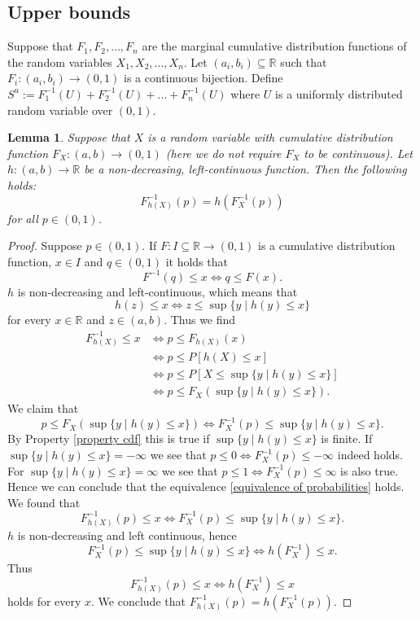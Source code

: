 \documentclass{article}
\newtheorem{lemma}{Lemma}
\begin{document}
\subsection{Upper bounds}
Suppose that $F_1,F_2,\dots, F_n$ are the marginal cumulative distribution functions of the random variables $X_1,X_2,\dots,X_n$. Let $(a_i,b_i)\subseteq\mathbb{R}$ such that $F_i: (a_i,b_i)\rightarrow(0,1)$ is a continuous bijection. Define $S^u := F^{-1}_1(U) + F^{-1}_2(U) + \dots + F^{-1}_n(U)$ where $U$ is a uniformly distributed random variable over $(0,1)$. 
\begin{lemma}\cite[Theorem 3.2.2]{Risk_Measurement}\label{inverse distribution function h(X)}
    Suppose that $X$ is a random variable with cumulative distribution function $F_X : (a,b)\rightarrow (0,1)$ (here we do not require $F_X$ to be continuous). Let $h : (a,b) \rightarrow \mathbb{R}$ be a non-decreasing, left-continuous function. Then the following holds:
    $$F_{h(X)}^{-1}(p) = h(F_X^{-1}(p))$$
    for all $p\in (0,1)$.
\end{lemma}
\begin{proof}
    Suppose $p\in (0,1)$. If $F: I\subseteq\mathbb{R}\rightarrow (0,1)$ is a cumulative distribution function, $x\in I$ and $q\in(0,1)$ it holds that
    \begin{equation}\label{property cdf}
        F^{-1}(q) \leq x \iff q \leq F(x).
    \end{equation}
    $h$ is non-decreasing and left-continuous, which means that 
    $$h(z) \leq x\iff z\leq \sup\{y\mid h(y)\leq x\}$$
    for every $x\in \mathbb{R}$ and $z\in (a,b)$. Thus we find
    \begin{align*}
        F_{h(X)}^{-1} \leq x &\iff p \leq F_{h(X)}(x) \\
        &\iff p \leq P[h(X)\leq x]\\
        &\iff p \leq P[X\leq \sup\{y\mid h(y)\leq x\}]\\
        &\iff p \leq F_X( \sup\{y\mid h(y)\leq x\}).
    \end{align*}
    We claim that 
    \begin{equation}\label{equivalence of probabilities}
        p \leq F_X( \sup\{y\mid h(y)\leq x\}) \iff F_X^{-1}(p) \leq  \sup\{y\mid h(y)\leq x\}.
    \end{equation}
    By Property \ref{property cdf} this is true if $ \sup\{y\mid h(y)\leq x\}$ is finite. If $ \sup\{y\mid h(y)\leq x\} = -\infty$ we see that $p \leq 0\iff F_X^{-1}(p)\leq -\infty$ indeed holds. For $ \sup\{y\mid h(y)\leq x\} = \infty$ we see that $p \leq 1\iff F_X^{-1}(p)\leq \infty$ is also true. Hence we can conclude that the equivalence \eqref{equivalence of probabilities} holds. We found that
    \begin{equation*}
        F_{h(X)}^{-1}(p) \leq x \iff F_X^{-1}(p) \leq  \sup\{y\mid h(y)\leq x\}.
    \end{equation*}
    $h$ is non-decreasing and left continuous, hence
    $$F_X^{-1}(p) \leq  \sup\{y\mid h(y)\leq x\} \iff h(F_X^{-1}) \leq x.$$
    Thus 
    $$F_{h(X)}^{-1}(p) \leq x  \iff h(F_X^{-1}) \leq x$$
    holds for every $x$. We conclude that $F_{h(X)}^{-1}(p) = h(F_X^{-1}(p))$.
\end{proof}
\end{document}
